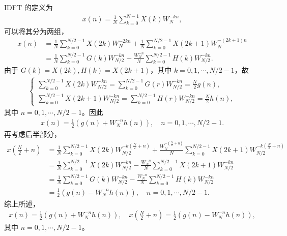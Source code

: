 \begin{solution}
    IDFT 的定义为
    \begin{align*}
        x(n) = \frac{1}{N}\sum_{k = 0}^{N - 1}X(k)W_N^{-kn},
    \end{align*}
    可以将其分为两组，
    \begin{align*}
        x(n) & = \frac{1}{N}\sum_{k = 0}^{N/2 - 1}X(2k)W_N^{-2kn}
            + \frac{1}{N}\sum_{k = 0}^{N/2 - 1}X(2k + 1)W_N^{-(2k + 1)n} \\
        & = \frac{1}{N}\sum_{k = 0}^{N/2 - 1}G(k)W_{N/2}^{-kn}
            + \frac{W_N^{-n}}{N}\sum_{k = 0}^{N/2 - 1}H(k)W_{N/2}^{-kn}.
    \end{align*}
    由于 $G(k) = X(2k), H(k) = X(2k + 1)$，其中 $k = 0, 1, \cdots, N / 2 - 1$，故
    \begin{align*}
        \begin{cases}
            \sum_{k = 0}^{N/2 - 1}X(2k)W_{N/2}^{-kn}
                = \sum_{k = 0}^{N/2 - 1}G(r)W_{N/2}^{-kn} = \frac{N}{2}g(n), \\
            \sum_{k = 0}^{N/2 - 1}X(2k + 1)W_{N/2}^{-kn}
                = \sum_{k = 0}^{N/2 - 1}H(r)W_{N/2}^{-kn} = \frac{N}{2}h(n),
        \end{cases}
    \end{align*}
    其中 $n = 0, 1, \cdots, N/2 - 1$。因此
    \begin{align*}
        x(n) = \frac{1}{2}\left(g(n) + W_N^{-n}h(n)\right), \quad n = 0, 1, \cdots, N / 2 - 1.
    \end{align*}
    再考虑后半部分，
    \begin{align*}
        x\left(\frac{N}{2} + n\right) & = \frac{1}{N}\sum_{k = 0}^{N/2 - 1}X(2k)W_{N/2}^{-k\left(\frac{N}{2} + n\right)}
            + \frac{W_N^{-\left(\frac{N}{2} + n\right)}}{N}\sum_{k = 0}^{N/2 - 1}X(2k + 1)W_{N/2}^{-k\left(\frac{N}{2} + n\right)} \\
        & = \frac{1}{N}\sum_{k = 0}^{N/2 - 1}X(2k)W_{N/2}^{-kn}
            - \frac{W_N^{-n}}{N}\sum_{k = 0}^{N/2 - 1}X(2k + 1)W_{N/2}^{-kn} \\
        & = \frac{1}{N}\sum_{k = 0}^{N/2 - 1}G(k)W_{N/2}^{-kn}
            - \frac{W_N^{-n}}{N}\sum_{k = 0}^{N/2 - 1}H(k)W_{N/2}^{-kn} \\
        & = \frac{1}{2}\left(g(n) - W_N^{-n}h(n)\right), \quad n = 0, 1, \cdots, N / 2 - 1.
    \end{align*}
    综上所述，
    \begin{align*}
        x(n) = \frac{1}{2}\left(g(n) + W_N^{-n}h(n)\right),
            \quad x\left(\frac{N}{2} + n\right) = \frac{1}{2}\left(g(n) - W_N^{-n}h(n)\right),
    \end{align*}
    其中 $n = 0, 1, \cdots, N / 2 - 1$。
\end{solution}

